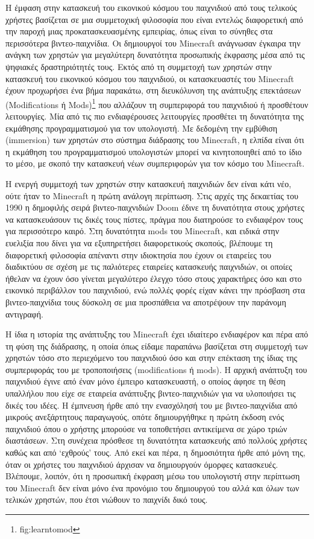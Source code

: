\documentclass[
]{article}
\begin{document}
Η έμφαση στην κατασκευή του εικονικού κόσμου του παιχνιδιού από τους
τελικούς χρήστες βασίζεται σε μια συμμετοχική φιλοσοφία που είναι
εντελώς διαφορετική από την παροχή μιας προκατασκευασμένης εμπειρίας,
όπως είναι το σύνηθες στα περισσότερα βιντεο-παιχνίδια. Οι δημιουργοί
του Minecraft ανάγνωσαν έγκαιρα την ανάγκη των χρηστών για μεγαλύτερη
δυνατότητα προσωπικής έκφρασης μέσα από τις ψηφιακές δραστηριότητές
τους. Εκτός από τη συμμετοχή των χρηστών στην κατασκευή του εικονικού
κόσμου του παιχνιδιού, οι κατασκευαστές του Minecraft έχουν προχωρήσει
ένα βήμα παρακάτω, στη διευκόλυνση της ανάπτυξης επεκτάσεων
(Modifications ή Mods)\footnote{fig:learntomod} που αλλάζουν τη
συμπεριφορά του παιχνιδιού ή προσθέτουν λειτουργίες. Μία από τις πιο
ενδιαφέρουσες λειτουργίες προσθέτει τη δυνατότητα της εκμάθησης
προγραμματισμού για τον υπολογιστή. Με δεδομένη την εμβύθιση (immersion)
των χρηστών στο σύστημα διάδρασης του Minecraft, η ελπίδα είναι ότι η
εκμάθηση του προγραμματισμού υπολογιστών μπορεί να κινητοποιηθεί από το
ίδιο το μέσο, με σκοπό την κατασκευή νέων συμπεριφορών για τον κόσμο του
Minecraft.

Η ενεργή συμμετοχή των χρηστών στην κατασκευή παιχνιδιών δεν είναι κάτι
νέο, ούτε ήταν το Minecraft η πρώτη ανάλογη περίπτωση. Στις αρχές της
δεκαετίας του 1990 η δημοφιλής σειρά βιντεο-παιχνιδιών Doom έδινε τη
δυνατότητα στους χρήστες να κατασκευάσουν τις δικές τους πίστες, πράγμα
που διατηρούσε το ενδιαφέρον τους για περισσότερο καιρό. Στη δυνατότητα
mods του Minecraft, και ειδικά στην ευελιξία που δίνει για να
εξυπηρετήσει διαφορετικούς σκοπούς, βλέπουμε τη διαφορετική φιλοσοφία
απέναντι στην ιδιοκτησία που έχουν οι εταιρείες του διαδικτύου σε σχέση
με τις παλιότερες εταιρείες κατασκευής παιχνιδιών, οι οποίες ήθελαν να
έχουν όσο γίνεται μεγαλύτερο έλεγχο τόσο στους χαρακτήρες όσο και στο
εικονικό περιβάλλον του παιχνιδιού, ενώ πολλές φορές είχαν κάνει την
πρόσβαση στα βιντεο-παιχνίδια τους δύσκολη σε μια προσπάθεια να
αποτρέψουν την παράνομη αντιγραφή.

Η ίδια η ιστορία της ανάπτυξης του Minecraft έχει ιδιαίτερο ενδιαφέρον
και πέρα από τη φύση της διάδρασης, η οποία όπως είδαμε παραπάνω
βασίζεται στη συμμετοχή των χρηστών τόσο στο περιεχόμενο του παιχνιδιού
όσο και στην επέκταση της ίδιας της συμπεριφοράς του με τροποποιήσεις
(modifications ή mods). Η αρχική ανάπτυξη του παιχνιδιού έγινε από έναν
μόνο έμπειρο κατασκευαστή, ο οποίος άφησε τη θέση υπαλλήλου που είχε σε
εταιρεία ανάπτυξης βιντεο-παιχνιδιών για να υλοποιήσει τις δικές του
ιδέες. Η έμπνευση ήρθε από την ενασχόλησή του με βιντεο-παιχνίδια από
μικρούς ανεξάρτητους παραγωγούς, οπότε δημιουργήθηκε η πρώτη έκδοση ενός
παιχνιδιού όπου ο χρήστης μπορούσε να τοποθετήσει αντικείμενα σε χώρο
τριών διαστάσεων. Στη συνέχεια πρόσθεσε τη δυνατότητα κατασκευής από
πολλούς χρήστες καθώς και από `εχθρούς' τους. Από εκεί και πέρα, η
δημοσιότητα ήρθε από μόνη της, όταν οι χρήστες του παιχνιδιού άρχισαν να
δημιουργούν όμορφες κατασκευές. Βλέπουμε, λοιπόν, ότι η προσωπική
έκφραση μέσω του υπολογιστή στην περίπτωση του Minecraft δεν είναι μόνο
ένα προνόμιο του δημιουργού του αλλά και όλων των τελικών χρηστών, που
έτσι νιώθουν το παιχνίδι δικό τους.
\end{document}
